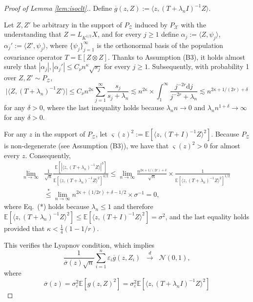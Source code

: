 \documentclass[11pt,a4paper]{article}
\renewcommand{\bar}{\overline}
\theoremstyle{definition}
\theoremstyle{plain}
\theoremstyle{remark}
\newcommand{\ud}{\mathrm d}
\begin{document}
\begin{proof}[Proof of Lemma \ref{lem:isoclt}.]
Define $\bar g(z,Z) := \langle z,(T+\lambda_n I)^{-1}Z\rangle$.
{\color{cyan}
Let $Z,Z'$ be arbitrary in the support of $P_{\mathcal Z}$ induced by $P_{\mathcal X}$ with the understanding that $Z=L_{K^{1/2}}X$,
and for every $j\geq 1$ define $\alpha_j := \langle Z,\psi_j\rangle$, $\alpha_j':=\langle Z',\psi_j\rangle$,
where $\{\psi_j\}_{j=1}^{\infty}$ is the orthonormal basis of the population covariance operator $T=\mathbb E[Z\otimes Z]$.
Thanks to Assumption (B3), it holds almost surely that $|\alpha_j|,|\alpha_j'|\leq C_\nu n^{\kappa}\sqrt{s_j}$ for every $j\geq 1$.
Subsequently, with probability 1 over $Z,Z'\sim P_{\mathcal Z}$, 
$$
\big|\langle Z,(T+\lambda_n)^{-1}Z'\rangle\big| \leq C_\nu n^{2\kappa}\sum_{j=1}^{\infty} \frac{s_j}{s_j+\lambda_n}\lesssim n^{2\kappa}\times \int_1^{\infty}\frac{ j^{-2r}\ud j}{j^{-2r}+\lambda_n} \lesssim n^{2\kappa+1/(2r)+\delta}
$$
for any $\delta>0$, where the last inequality holds because $\lambda_n n\to 0$ and $\lambda_n n^{1+\delta}\to \infty$ for any $\delta>0$.

For any $z$ in the support of $P_{\mathcal Z}$, let $\varsigma(z)^2 := \mathbb E[\langle z,(T+I)^{-1}Z\rangle^2]$.
Because $P_{\mathcal Z}$ is non-degenerate (see Assumption (B3)), we have that $\varsigma(z)^2 > 0$ for almost every $z$. Consequently, 
\begin{align*}
\lim_{n\to\infty}& \frac{1}{\sqrt{n}}\frac{\mathbb E[|\langle z, (T+\lambda_n)^{-1}Z\rangle|^3]}{\mathbb E[\langle z,(T+\lambda_n)^{-1}Z\rangle^2]^{3/2}} \leq 
\lim_{n\to\infty}\frac{n^{2\kappa+1/(2r)+\delta}}{\sqrt{n}} \times \frac{1}{\mathbb E[\langle z,(T+\lambda_n)^{-1}Z\rangle^2]^{1/2}}\\
&\overset{*}{\leq} \lim_{n\to\infty} n^{2\kappa+(1/2r)+\delta-1/2}\times \sigma^{-1} = 0,
\end{align*}
where Eq.~(*) holds because $\lambda_n\leq 1$ and therefore $\mathbb E[\langle z,(T+\lambda_n)^{-1}Z\rangle^2] \leq \mathbb E[\langle z,(T+I)^{-1}Z\rangle^2] = \sigma^2$,
and the last equality holds provided that $\kappa < \frac{1}{4}(1-1/r)$.
}
This verifies the Lyapnov condition, which implies 
\begin{equation}
\frac{1}{\bar\sigma(z)\sqrt{n}}\sum_{i=1}^n \varepsilon_i\bar g(z,Z_i) \;\;\overset{d}{\to}\;\;\mathcal N(0,1),
\label{eq:proof-isoclt-1}
\end{equation}
where
$$
\bar\sigma(z) =\sigma_\varepsilon^2\mathbb E[g(z,Z)^2]= \sigma_\varepsilon^2\mathbb E[\langle z, (T+\lambda_n I)^{-1}Z\rangle^2]
$$


\end{proof}
\end{document}
